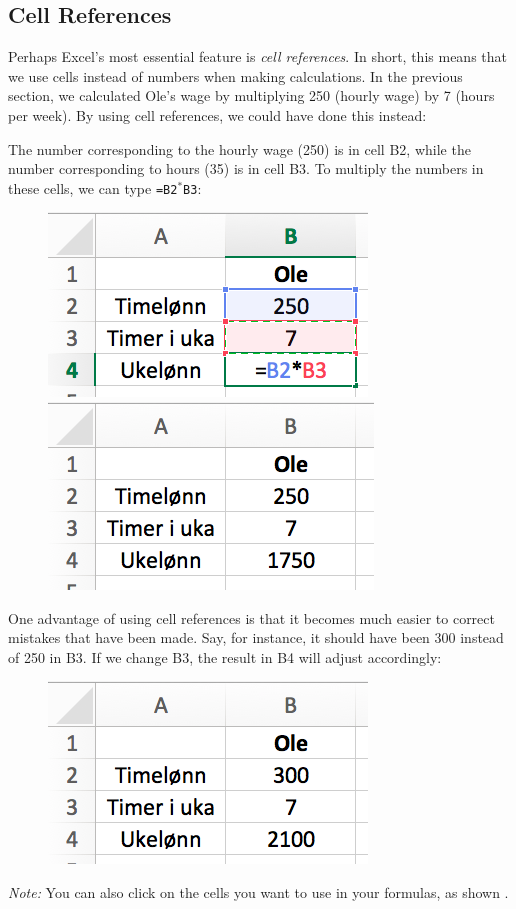 \subsection{Cell References}
Perhaps Excel's most essential feature is \textit{cell references}. In short, this means that we use cells instead of numbers when making calculations. In the previous section, we calculated Ole's wage by multiplying 250 (hourly wage) by 7 (hours per week). By using cell references, we could have done this instead:

The number corresponding to the hourly wage (250) is in cell B2, while the number corresponding to hours (35) is in cell B3. To multiply the numbers in these cells, we can type {\tt =B2$ ^* $B3}: 

\begin{figure}[H]
	\centering
	\includegraphics[scale=0.3]{figs/ex5}\qquad
	\includegraphics[scale=0.3]{figs/ex4}
\end{figure}
One advantage of using cell references is that it becomes much easier to correct mistakes that have been made. Say, for instance, it should have been 300 instead of 250 in B3. If we change B3, the result in B4 will adjust accordingly:
\begin{figure}[H]
	\centering
	\includegraphics[scale=0.3]{figs/ex6}
\end{figure}
\textsl{Note:} You can also click on the cells you want to use in your formulas, as shown .

